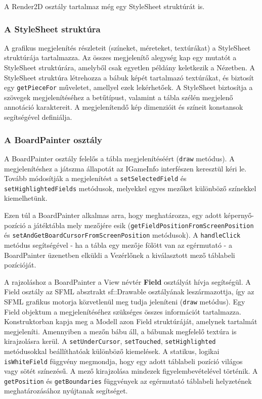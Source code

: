 \documentclass[12pt, twoside]{report}
\begin{document}
A Render2D osztály tartalmaz még egy StyleSheet struktúrát is.

\subsubsection{A StyleSheet struktúra}

A grafikus megjelenítés részleteit (színeket, méreteket, textúrákat) a StyleSheet struktúrája tartalmazza. Az összes megjelenítő alegység kap egy mutatót a StyleSheet struktúrára, amelyből csak egyetlen példány keletkezik a Nézetben. A StyleSheet struktúra létrehozza a bábuk képét tartalmazó textúrákat, és biztosít egy {\tt getPieceFor} műveletet, amellyel ezek lekérhetőek. A StyleSheet biztosítja a szövegek megjelenítéséhez a betűtípust, valamint a tábla szélén megjelenő annotáció karaktereit. A megjelenítendő kép dimenzióit és színeit konstansok segítségével definiálja. 

\subsubsection{A BoardPainter osztály}

A BoardPainter osztály felelős a tábla megjelenítéséért ({\tt draw} metódus). A megjelenítéshez a játszma állapotát az IGameInfo interfészen keresztül kéri le. Tovább módosítják a megjelenítést a {\tt setSelectedField} és {\tt setHighlightedFields} metódusok, melyekkel egyes mezőket különböző színekkel kiemelhetünk.

Ezen túl a BoardPainter alkalmas arra, hogy meghatározza, egy adott képernyő-pozíció a játéktábla mely mezőjére esik ({\tt getFieldPositionFromScreenPosition} és {\tt setAndGetBoardCursorFromScreenPosition} metódusok). A {\tt handleClick} metódus segítségével - ha a tábla egy mezője fölött van az egérmutató - a BoardPainter üzenetben elküldi a Vezérlőnek a kiválasztott mező táblabeli pozícióját.

A rajzoláshoz a BoardPainter a View névtér \textbf{Field} osztályát hívja segítségül. A Field osztály az SFML absztrakt sf::Drawable osztályának leszármazottja, így az SFML grafikus motorja közvetlenül meg tudja jeleníteni ({\tt draw} metódus). Egy Field objektum a megjelenítéséhez szükséges összes információt tartalmazza. Konstruktorban kapja meg a Modell azon Field struktúráját, amelynek tartalmát megjeleníti. Amennyiben a mezőn bábu áll, a bábunak megfelelő textúra is kirajzolásra kerül. A {\tt setUnderCursor}, {\tt setTouched}, {\tt setHighlighted} metódusokkal beállíthatóak különböző kiemelések. A statikus, logikai {\tt isWhiteField} függvény megmondja, hogy egy adott táblabeli pozíció világos vagy sötét színezésű. A mező kirajzolása mindezek figyelembevételével történik. A {\tt getPosition} és {\tt getBoundaries} függvények az egérmutató táblabeli helyzetének meghatározásához nyújtanak segítséget.
\end{document}
